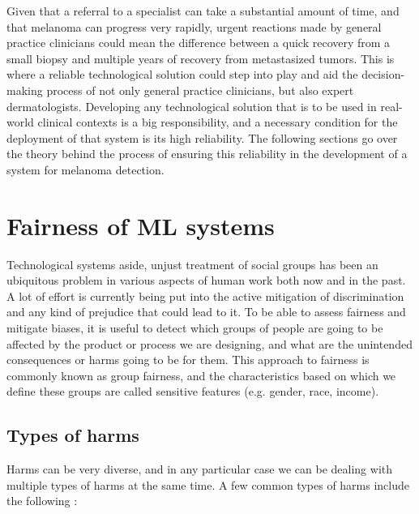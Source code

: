 Given that a referral to a specialist can take a substantial amount of time, and that melanoma can progress very rapidly, urgent reactions made by general practice clinicians could mean the difference between a quick recovery from a small biopsy and multiple years of recovery from metastasized tumors. This is where a reliable technological solution could step into play and aid the decision-making process of not only general practice clinicians, but also expert dermatologists. Developing any technological solution that is to be used in real-world clinical contexts is a big responsibility, and a necessary condition for the deployment of that system is its high reliability. The following sections go over the theory behind the process of ensuring this reliability in the development of a system for melanoma detection.

\section{Fairness of ML systems}

Technological systems aside, unjust treatment of social groups has been an ubiquitous problem in various aspects of human work both now and in the past. A lot of effort is currently being put into the active mitigation of discrimination and any kind of prejudice that could lead to it. To be able to assess fairness and mitigate biases, it is useful to detect which groups of people are going to be affected by the product or process we are designing, and what are the unintended consequences or harms going to be for them. This approach to fairness is commonly known as group fairness, and the characteristics based on which we define these groups are called sensitive features (e.g. gender, race, income).

\subsection{Types of harms}

Harms can be very diverse, and in any particular case we can be dealing with multiple types of harms at the same time. A few common types of harms include the following \cite{fairlearn}:

